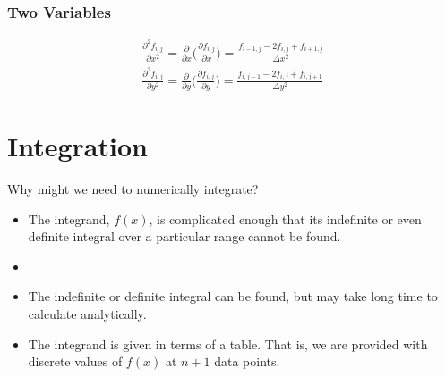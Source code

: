 \documentclass[12pt, answers]{exam}
\begin{document}
\subsubsection*{Two Variables}
\begin{align*}
\frac{\partial^2 f_{i,j}}{\partial x^2} = \frac{\partial}{\partial x}\bigl(\frac{\partial f_{i,j}}{\partial x}\bigr) =
\frac{f_{i-1,j} - 2f_{i,j} + f_{i+1,j}}{\Delta x^2} \\
%
\frac{\partial^2 f_{i,j}}{\partial y^2} = \frac{\partial}{\partial y}\bigl(\frac{\partial f_{i,j}}{\partial y}\bigr) =
\frac{f_{i,j-1} - 2f_{i,j} + f_{i,j+1}}{\Delta y^2}
\end{align*}
\begin{center}
\end{center}


\vspace*{-2em}
\section*{Integration}
Why might we need to numerically integrate?
\begin{itemize}
\ifprintanswers
\item The integrand, $f(x)$, is complicated enough that its
indefinite or even definite integral over a particular range cannot
be found.
\else
\item
\fi
\item The indefinite or definite integral can be found, but may take
long time to calculate analytically.
\item The integrand is given in terms of a table. That is, we are
provided with discrete values of $f(x)$ at $n+1$ data points.
\end{itemize}
\end{document}
